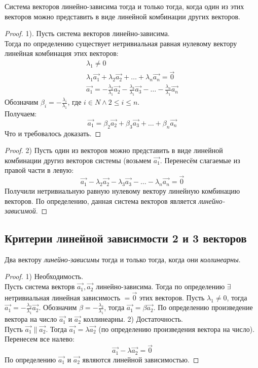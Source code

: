\begin{theorem}
  Система векторов линейно-зависима тогда и только тогда, когда один из этих векторов можно представить в виде линейной комбинации других векторов.
\end{theorem}
\begin{proof}
  1). Пусть система векторов линейно-зависима. \\
  Тогда по определению существует нетривиальная равная нулевому вектору линейная комбинация этих векторов:
  \begin{gather*}
    \lambda_1 \neq  0 \\
    \lambda_1 \vec{a_1} + \lambda_2 \vec{a_2} + \ldots + \lambda_n \vec{a_n} = \vec{0} \\
    \vec{a_1} = - \frac{\lambda_2}{\lambda_1} \vec{a_2} - \frac{\lambda_3}{\lambda_1} \vec{a_3} - \ldots - \frac{\lambda_n}{\lambda_1} \vec{a_n}
  \end{gather*}
  Обозначим $\beta_i = - \frac{\lambda_i}{\lambda_1}$, где $i \in N \land 2 \le i \le n$. \\
  Получаем:
  \[
  \vec{a_1} = \beta_2 \vec{a_2} + \beta_3 \vec{a_3} + \ldots + \beta_n \vec{a_n}
  \] 
  Что и требовалось доказать.
\end{proof}
\begin{proof}
  2) Пусть один из векторов можно представить в виде линейной комбинации другиз векторов системы (возьмем $\vec{a_1}$. Перенесём слагаемые из правой части в левую:
  \[
  \vec{a_1} - \lambda_2 \vec{a_2} - \lambda_3 \vec{a_3} - \ldots - \lambda_n \vec{a_n} = \vec{0}
  \]
  Получили нетривиальную равную нулевому вектору линейную комбинацию векторов. По определению, данная система векторов является \textit{линейно-зависимой}. 
\end{proof}

\subsection{Критерии линейной зависимости 2 и 3 векторов}

\begin{theorem}
  Два вектору \textit{линейно-зависимы} тогда и только тогда, когда они \textit{коллинеарны}.
\end{theorem}
\begin{proof}
  1) Необходимость. \\
Пусть система векторв $\vec{a_1}, \vec{a_2}$ линейно-зависима. Тогда по определению $\exists$ нетривиальная линейная зависимость $=\vec{0}$ этих векторов. Пусть $\lambda_1 \neq 0$, тогда $\vec{a_1} = - \frac{\lambda_2}{\lambda_1} \vec{a_2}$. Обозначим $\beta = -\frac{\lambda_2}{\lambda_1}$, тогда $\vec{a_1} = \beta \vec{a_2}$. По определению произведение вектора на число $\vec{a_1}$ и $\vec{a_2}$ коллинеарны.
  2) Достаточность. \\
  Пусть $\vec{a_1} \parallel \vec{a_2}$. Тогда $ \vec{a_1} = \lambda \vec{a_2}$ (по определению произведения вектора на число). Перенесем все налево: 
  \[
  \vec{a_1} - \lambda \vec{a_2} = \vec{0}
  \] 
  По определению $\vec{a_1}$ и $\vec{a_2}$ являются линейной зависимостью.
\end{proof}

